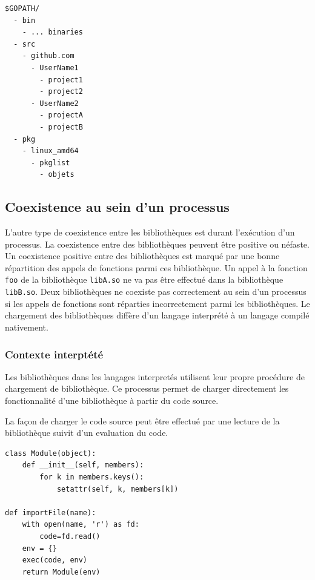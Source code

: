 \begin{verbatim}
$GOPATH/
  - bin
    - ... binaries
  - src
    - github.com
      - UserName1
        - project1
        - project2
      - UserName2
        - projectA
        - projectB
  - pkg
    - linux_amd64
      - pkglist
        - objets
\end{verbatim}



\subsection{Coexistence au sein d'un processus}
L'autre type de coexistence entre les bibliothèques est durant l'exécution d'un
processus.  La coexistence entre des bibliothèques peuvent être positive ou
néfaste.  Un coexistence positive entre des bibliothèques est marqué par une
bonne répartition des appels de fonctions parmi ces bibliothèque.  Un appel à
la fonction \verb|foo| de la bibliothèque \verb|libA.so| ne va pas être
effectué dans la bibliothèque \verb|libB.so|. Deux bibliothèques ne coexiste
pas correctement au sein d'un processus si les appels de fonctions sont
réparties incorrectement parmi les bibliothèques. Le chargement des bibliothèques
diffère d'un langage interprété à un langage compilé nativement.

\subsubsection{Contexte interptété}
Les bibliothèques dans les langages interpretés utilisent leur propre procédure
de chargement de bibliothèque. Ce processus permet de charger directement les
fonctionnalité d'une bibliothèque à partir du code source.

La façon de charger le code source peut être effectué par une lecture de la
bibliothèque suivit d'un evaluation du code.

\begin{verbatim}
class Module(object):
    def __init__(self, members):
        for k in members.keys():
            setattr(self, k, members[k])

def importFile(name):
    with open(name, 'r') as fd:
        code=fd.read()
    env = {}
    exec(code, env)
    return Module(env)

\end{verbatim}

